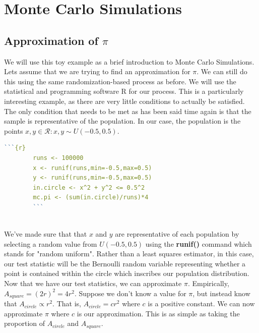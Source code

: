 
\section{Monte Carlo Simulations}

\subsection{Approximation of $\pi$}

We will use this toy example as a brief introduction to Monte Carlo Simulations. Lets assume that we are trying to find an approximation for $\pi$. We can still do this using the same randomization-based process as before. We will use the statistical and programming software R for our process. This is a particularly interesting example, as there are very little conditions to actually be satisfied. The only condition that needs to be met as has been said time again is that the sample is representative of the population. In our case, the population is the points $x,y\in\mathscr{R}: x,y\sim U(-0.5,0.5)$. 
\begin{center}
    \begin{lstlisting}[language = R]
        ```{r}
        runs <- 100000
        x <- runif(runs,min=-0.5,max=0.5)
        y <- runif(runs,min=-0.5,max=0.5)
        in.circle <- x^2 + y^2 <= 0.5^2
        mc.pi <- (sum(in.circle)/runs)*4
        ```
    \end{lstlisting}
\end{center}
\newline\\
We've made sure that that $x$ and $y$ are representative of each population by selecting a random value from $U(-0.5,0.5)$ using the \textbf{runif()} command which stands for "random uniform". Rather than a least squares estimator, in this case, our test statistic will be the Bernoulli random variable representing whether a point is contained within the circle which inscribes our population distribution. Now that we have our test statistics, we can approximate $\pi$. Empirically, $A_{square}=(2r)^2=4r^2$. Suppose we don't know a value for $\pi$, but instead know that $A_{circle}\propto r^2$. That is, $A_{circle}=cr^2$ where $c$ is a positive constant. We can now approximate $\pi$ where $c$ is our approximation. This is as simple as taking the proportion of $A_{circle}$ and $A_{square}$.


